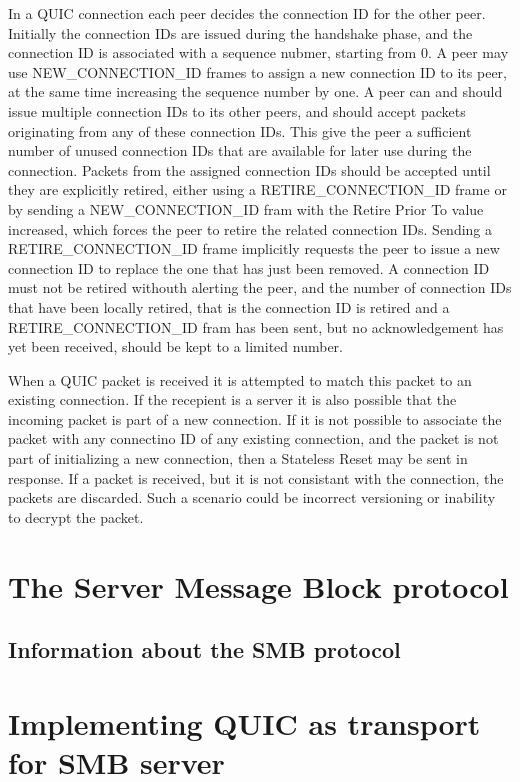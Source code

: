 \documentclass[english, 12pt, a4paper, elec, utf8, a-2b, online]{aaltothesis}
\begin{document}
In a QUIC connection each peer decides the connection ID for the other peer. Initially
the connection IDs are issued during the handshake phase, and the connection ID is
associated with a sequence nubmer, starting from 0. A peer may use NEW\_CONNECTION\_ID frames
to assign a new connection ID to its peer, at the same time increasing the sequence
number by one. A peer can and should issue multiple connection IDs to its other peers,
and should accept packets originating from any of these connection IDs. This give the peer
a sufficient number of unused connection IDs that are available for later use during
the connection. Packets from the assigned connection IDs should be accepted until
they are explicitly retired, either using a RETIRE\_CONNECTION\_ID frame or by
sending a NEW\_CONNECTION\_ID fram with the Retire Prior To value increased, which
forces the peer to retire the related connection IDs. Sending a RETIRE\_CONNECTION\_ID
frame implicitly requests the peer to issue a new connection ID to replace the one
that has just been removed. A connection ID must not be retired withouth alerting the peer,
and the number of connection IDs that have been locally retired, that is the connection
ID is retired and a RETIRE\_CONNECTION\_ID fram has been sent, but no acknowledgement
has yet been received, should be kept to a limited number\cite{rfc9000}.

When a QUIC packet is received it is attempted to match this packet to an existing
connection. If the recepient is a server it is also possible that the incoming
packet is part of a new connection. If it is not possible to associate the packet
with any connectino ID of any existing connection, and the packet is not part of
initializing a new connection, then a Stateless Reset may be sent in response. If
a packet is received, but it is not consistant with the connection, the packets
are discarded. Such a scenario could be incorrect versioning or inability to
decrypt the packet\cite{rfc9000}.

\clearpage

\section{The Server Message Block protocol}

\subsection{Information about the SMB protocol}
\clearpage
\section{Implementing QUIC as transport for SMB server}
\end{document}
